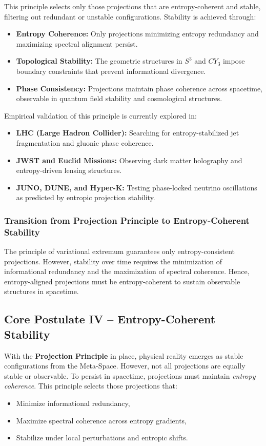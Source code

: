 \documentclass[10.5pt,a4paper]{article}
\begin{document}
This principle selects only those projections that are entropy-coherent and stable, filtering out redundant or unstable configurations. Stability is achieved through:
\begin{itemize}
    \item \textbf{Entropy Coherence:} Only projections minimizing entropy redundancy and maximizing spectral alignment persist.
    \item \textbf{Topological Stability:} The geometric structures in \(S^3\) and \(CY_3\) impose boundary constraints that prevent informational divergence.
    \item \textbf{Phase Consistency:} Projections maintain phase coherence across spacetime, observable in quantum field stability and cosmological structures.
\end{itemize}

Empirical validation of this principle is currently explored in:
\begin{itemize}
    \item \textbf{LHC (Large Hadron Collider):} Searching for entropy-stabilized jet fragmentation and gluonic phase coherence.
    \item \textbf{JWST and Euclid Missions:} Observing dark matter holography and entropy-driven lensing structures.
    \item \textbf{JUNO, DUNE, and Hyper-K:} Testing phase-locked neutrino oscillations as predicted by entropic projection stability.
\end{itemize}

\subsubsection*{Transition from Projection Principle to Entropy-Coherent Stability}

The principle of variational extremum guarantees only entropy-consistent projections. However, stability over time requires the minimization of informational redundancy and the maximization of spectral coherence. Hence, entropy-aligned projections must be entropy-coherent to sustain observable structures in spacetime.

\subsection{Core Postulate IV – Entropy-Coherent Stability}

With the \textbf{Projection Principle} in place, physical reality emerges as stable configurations from the Meta-Space. However, not all projections are equally stable or observable. To persist in spacetime, projections must maintain \emph{entropy coherence}. This principle selects those projections that:
\begin{itemize}
    \item Minimize informational redundancy,
    \item Maximize spectral coherence across entropy gradients,
    \item Stabilize under local perturbations and entropic shifts.
\end{itemize}
\end{document}
